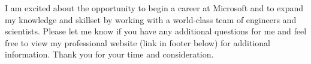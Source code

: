 \documentclass[11pt,a4paper,sans]{moderncv}
\begin{document}
	I am excited about the opportunity to begin a career at Microsoft and to expand my knowledge and skillset by working with a world-class team of engineers and scientists. %
Please let me know if you have any additional questions for me and feel free to view my professional website (link in footer below) for additional information. Thank you for your time and consideration.\\
	
	\vspace{3mm}
	
	\makeletterclosing
	
\end{document}
